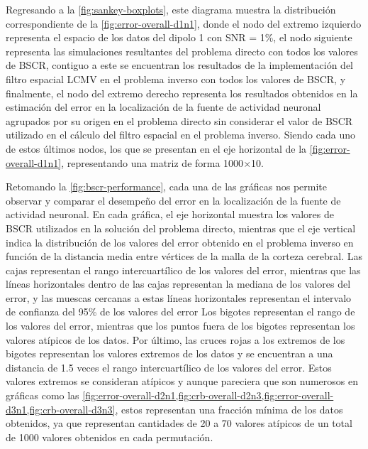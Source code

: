 Regresando a la \cref{fig:sankey-boxplots}, este diagrama muestra la distribución correspondiente de la \cref{fig:error-overall-d1n1}, donde el nodo del extremo izquierdo representa el espacio de los datos del dipolo 1 con SNR = 1\%, el nodo siguiente representa las simulaciones resultantes del problema directo con todos los valores de BSCR, contiguo a este se encuentran los resultados de la implementación del filtro espacial LCMV en el problema inverso con todos los valores de BSCR, y finalmente, el nodo del extremo derecho representa los resultados obtenidos en la estimación del error en la localización de la fuente de actividad neuronal agrupados por su origen en el problema directo sin considerar el valor de BSCR utilizado en el cálculo del filtro espacial en el problema inverso.
Siendo cada uno de estos últimos nodos, los que se presentan en el eje horizontal de la \cref{fig:error-overall-d1n1}, representando una matriz de forma 1000$\times$10. 

Retomando la \cref{fig:bscr-performance}, cada una de las gráficas nos permite observar y comparar el desempeño del error en la localización de la fuente de actividad neuronal.
En cada gráfica, el eje horizontal muestra los valores de BSCR utilizados en la solución del problema directo, mientras que el eje vertical indica la distribución de los valores del error obtenido en el problema inverso en función de la distancia media entre vértices de la malla de la corteza cerebral.
Las cajas representan el rango intercuartílico de los valores del error, mientras que las líneas horizontales dentro de las cajas representan la mediana de los valores del error, y las muescas cercanas a estas líneas horizontales representan el intervalo de confianza del 95\% de los valores del error
Los bigotes representan el rango de los valores del error, mientras que los puntos fuera de los bigotes representan los valores atípicos de los datos.
Por último, las cruces rojas a los extremos de los bigotes representan los valores extremos de los datos y se encuentran a una distancia de 1.5 veces el rango intercuartílico de los valores del error.
Estos valores extremos se consideran atípicos y aunque pareciera que son numerosos en gráficas como las \cref{fig:error-overall-d2n1,fig:crb-overall-d2n3,fig:error-overall-d3n1,fig:crb-overall-d3n3}, estos representan una fracción mínima de los datos obtenidos, ya que representan cantidades de 20 a 70 valores atípicos de un total de 1000 valores obtenidos en cada permutación.

